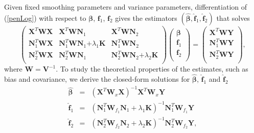 \documentclass[12pt, notitlepage]{article}
\begin{document}
Given fixed smoothing parameters and variance parameters, differentiation of (\ref{penLog}) with respect to $\boldsymbol \beta$, $\boldsymbol f_1$, $\boldsymbol f_2$ gives the estimators 
$(\boldsymbol {\hat \beta}, \boldsymbol {\hat f}_1, \boldsymbol {\hat f}_2)$ that solves
\[
 \begin{pmatrix}
  \boldsymbol X^T  \boldsymbol W \boldsymbol X & \boldsymbol X^T  \boldsymbol W \boldsymbol N_1 & \boldsymbol X^T  \boldsymbol W \boldsymbol N_2 \\
   \boldsymbol N_1^T  \boldsymbol W\boldsymbol X & \boldsymbol N_1^T  \boldsymbol W \boldsymbol N_1 \boldsymbol 
 + \lambda_1 \boldsymbol K &  \boldsymbol N_1^T  \boldsymbol W \boldsymbol N_2  \\
  \boldsymbol N_2^T  \boldsymbol W\boldsymbol X &  \boldsymbol N_2^T  \boldsymbol W \boldsymbol N_1 & \boldsymbol N_2^T  \boldsymbol W \boldsymbol N_2 \boldsymbol 
 +
  \lambda_2 \boldsymbol K \\
 \end{pmatrix}
  \begin{pmatrix}
   \boldsymbol \beta \\
 \boldsymbol f_1 \\
 \boldsymbol f_2\\
 \end{pmatrix}
  =
 \begin{pmatrix}
   \boldsymbol X^T  \boldsymbol W \boldsymbol Y \\
   \boldsymbol N_1^T  \boldsymbol W \boldsymbol Y  \\
  \boldsymbol N_2^T  \boldsymbol W \boldsymbol Y  \\
 \end{pmatrix},
 \]
where $\boldsymbol W = \boldsymbol V^{-1}$.
To study the theoretical properties of the estimates, such as bias and covariance, we derive the closed-form solutions  for $\boldsymbol {\hat \beta}$, $\boldsymbol {\hat f}_1$ and $\boldsymbol {\hat f}_2$
\begin{eqnarray}
 \boldsymbol {\hat \beta} 
  &=&
 (\boldsymbol X^T  \boldsymbol W_x \boldsymbol X )^{-1} \boldsymbol X^T  \boldsymbol W_x \boldsymbol Y 
\label{betaHat} \\
 \boldsymbol {\hat f}_1
   &=&
  (\boldsymbol N_1^T 
\boldsymbol W_{f_1}  \boldsymbol N_1
  + \lambda_1 \boldsymbol K)^{-1}  \boldsymbol N_1^T \boldsymbol W_{f_1} \boldsymbol Y
\label{f1Hat} \\
  \boldsymbol {\hat f}_2 
  &=&
 (\boldsymbol N_2^T 
\boldsymbol W_{f_2}  \boldsymbol N_2
  + \lambda_2 \boldsymbol K)^{-1}  \boldsymbol N_2^T \boldsymbol W_{f_2} \boldsymbol Y,
\label{f2Hat}
\end{eqnarray}
\end{document}

